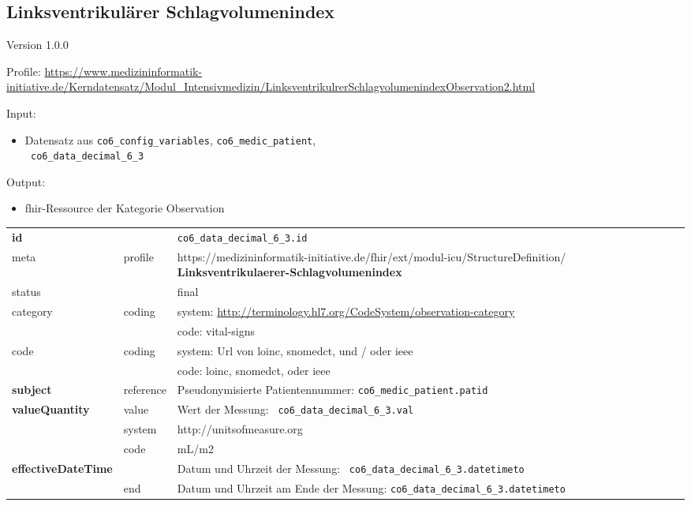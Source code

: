 \subsection{Linksventrikulärer Schlagvolumenindex} 
\noindent Version 1.0.0

\noindent Profile: \url{https://www.medizininformatik-initiative.de/Kerndatensatz/Modul_Intensivmedizin/LinksventrikulrerSchlagvolumenindexObservation2.html}

\noindent Input:
\begin{itemize}
	\item Datensatz aus \texttt{co6\_config\_variables}, \texttt{co6\_medic\_patient}, \\ \texttt{
co6\_data\_decimal\_6\_3}
\end{itemize}
Output:
\begin{itemize}
        \item \ac{fhir}-Ressource der Kategorie \glqq Observation\grqq{}
\end{itemize}
\begin{longtable}{|l|l|p{7.5cm}|}
        \hline
        \rowcolor{lightgray} \multicolumn{3}{|l|}{Data Mapping (inhaltlich)} \\ \hline
        \textbf{id} &  & \texttt{co6\_data\_decimal\_6\_3.id} \\ \hline
	meta & profile & https://medizininformatik-initiative.de/fhir/ext/modul-icu/StructureDefinition/\textbf{
Linksventrikulaerer-Schlagvolumenindex} \\ \hline 
	status &  & final   \\ \hline 
	category & coding & system: \url{http://terminology.hl7.org/CodeSystem/observation-category} \\
\cline{3-3}
	& & code: vital-signs \\ \hline
	code & coding & system: Url von \ac{loinc}, \ac{snomedct}, und / oder \ac{ieee} \\ 
	\cline{3-3} 
	 &  & code: \ac{loinc}, \ac{snomedct}, oder \ac{ieee} \\ \hline
	 \textbf{subject}  & reference & Pseudonymisierte Patientennummer: \texttt{co6\_medic\_patient.patid} \\ \hline
	 \textbf{valueQuantity}  & value & Wert der Messung: \texttt{
co6\_data\_decimal\_6\_3.val} \\
        \cline{2-3}
         & system & http://unitsofmeasure.org \\
         \cline{2-3}
         & code & mL/m2 \\ \hline
     \textbf{effectiveDateTime}  & & Datum und Uhrzeit der Messung: \texttt{
co6\_data\_decimal\_6\_3.datetimeto} \\
    \cline{2-3}
     & end & Datum und Uhrzeit am Ende der Messung: \texttt{co6\_data\_decimal\_6\_3.datetimeto} \\ \hline
\end{longtable}


